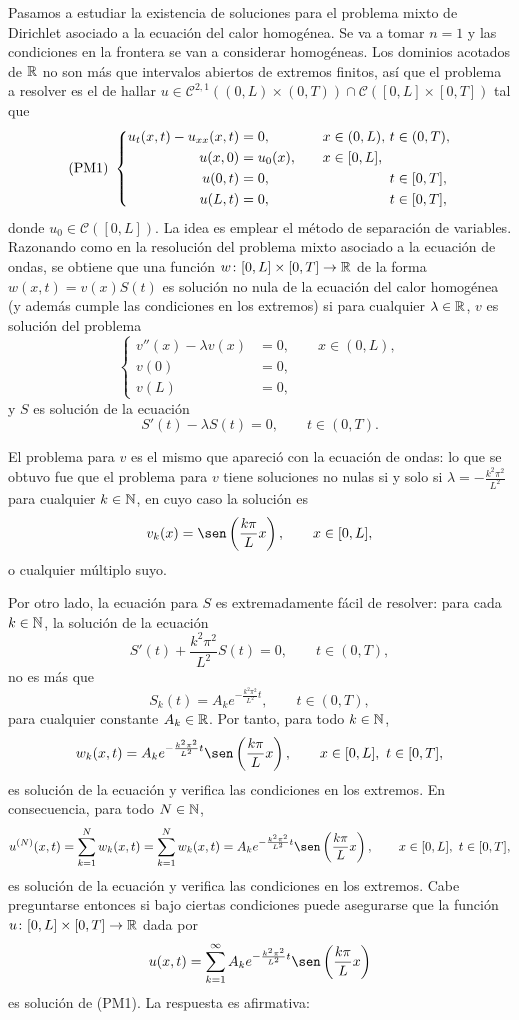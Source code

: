 \documentclass[a4paper, 12pt, extrafontsizes]{memoir}
\begin{document}
Pasamos a estudiar la existencia de soluciones para el problema mixto de Dirichlet asociado a la ecuación del calor homogénea. Se va a tomar $n = 1$ y las condiciones en la frontera se van a considerar homogéneas. Los dominios acotados de $\mathbb R$ no son más que intervalos abiertos de extremos finitos, así que el problema a resolver es el de hallar $u \in \mathcal{C}^{2,1}((0,L) \times (0,T)) \cap \mathcal{C}([0,L] \times [0,T])$ tal que
\[
    (\textup{PM1}) \ \left\{\begin{alignedat}{5}
        u_{t}(x,t)-u_{xx}(x,t) &= 0, \qquad & x &\in (0,L), \ & t &\in (0,T), \\
        u(x,0) &= u_0(x), \qquad & x &\in [0,L], & & \\
        u(0,t) &= 0, \qquad & & & t &\in [0,T], \\
        u(L,t) &= 0, \qquad & & & t &\in [0,T], \\
    \end{alignedat}\right.
\]
donde $u_0 \in \mathcal{C}([0,L])$. La idea es emplear el método de separación de variables. Razonando como en la resolución del problema mixto asociado a la ecuación de ondas, se obtiene que una función $w \colon [0,L] \times [0,T] \to \mathbb R$ de la forma $w(x,t)=v(x)S(t)$ es solución no nula de la ecuación del calor homogénea (y además cumple las condiciones en los extremos) si para cualquier $\lambda \in \mathbb R$, $v$ es solución del problema 
\[\left\{\begin{alignedat}{1}
    v''(x)-\lambda v(x) &= 0, \qquad x \in (0,L),\\
    v(0)&=0,\\
    v(L)&=0,
\end{alignedat}\right.\]
y $S$ es solución de la ecuación
\[S'(t) -\lambda S(t) = 0, \qquad t \in (0,T).\]

El problema para $v$ es el mismo que apareció con la ecuación de ondas: lo que se obtuvo fue que el problema para $v$ tiene soluciones no nulas si y solo si $\lambda = -\frac{k^2\pi^2}{L^2}$ para cualquier $k \in \mathbb N$, en cuyo caso la solución es
\[v_k(x) = \sen\left(\frac{k\pi}{L}x\right), \qquad x \in [0,L],\]
o cualquier múltiplo suyo.

Por otro lado, la ecuación para $S$ es extremadamente fácil de resolver: para cada $k \in \mathbb N$, la solución de la ecuación
\[S'(t) +\frac{k^2\pi^2}{L^2} S(t) = 0, \qquad t \in (0,T),\]
no es más que
\[S_k(t) = A_ke^{-\frac{k^2\pi^2}{L^2}t}, \qquad t \in (0,T),\]
para cualquier constante $A_k \in \mathbb R$. Por tanto, para todo $k \in \mathbb N$,
\[w_k(x,t)= A_ke^{-\frac{k^2\pi^2}{L^2}t}\sen\left(\frac{k\pi}{L}x\right), \qquad x\in [0,L], \ t \in [0,T], \]
es solución de la ecuación y verifica las condiciones en los extremos. En consecuencia, para todo $N \in \mathbb N$,
\[u^{(N)}(x,t) = \sum_{k=1}^N w_k(x,t) = \sum_{k=1}^N w_k(x,t)= A_ke^{-\frac{k^2\pi^2}{L^2}t}\sen\left(\frac{k\pi}{L}x\right), \qquad x\in [0,L], \ t \in [0,T], \]
es solución de la ecuación y verifica las condiciones en los extremos. Cabe preguntarse entonces si bajo ciertas condiciones puede asegurarse que la función $u \colon [0,L] \times [0,T] \to \mathbb R$ dada por
\[u(x,t)= \sum_{k=1}^\infty A_ke^{-\frac{k^2\pi^2}{L^2}t}\sen\left(\frac{k\pi}{L}x\right)\]
es solución de (PM1). La respuesta es afirmativa:
\end{document}
